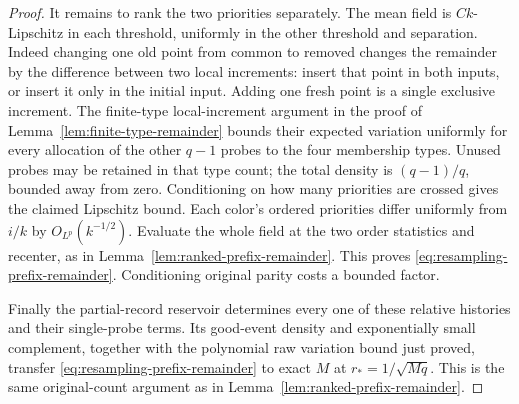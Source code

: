 \documentclass[11pt,letterpaper]{article}
\begin{document}
\begin{proof}
It remains to rank the two priorities separately.
The mean field is $Ck$-Lipschitz in each threshold, uniformly
in the other threshold and separation.
Indeed changing one old point from common to removed changes
the remainder by the difference between two local increments:
insert that point in both inputs, or insert it only in
the initial input. Adding one fresh point is a single
exclusive increment.
The finite-type local-increment argument in the proof of
Lemma~\ref{lem:finite-type-remainder} bounds their expected
variation uniformly for every allocation of the other
$q-1$ probes to the four membership types.
Unused probes may be retained in that type count; the
total density is $(q-1)/q$, bounded away from zero.
Conditioning on how many priorities are crossed gives the
claimed Lipschitz bound.
Each color's ordered priorities differ uniformly from
$i/k$ by $O_{L^p}(k^{-1/2})$.
Evaluate the whole field at the two order statistics and
recenter, as in Lemma~\ref{lem:ranked-prefix-remainder}.
This proves \eqref{eq:resampling-prefix-remainder}.
Conditioning original parity costs a bounded factor.

Finally the partial-record reservoir determines every one
of these relative histories and their single-probe terms.
Its good-event density and exponentially small complement,
together with the polynomial raw variation bound just proved,
transfer \eqref{eq:resampling-prefix-remainder} to exact $M$
at $r_*=1/\sqrt{Mq}$. This is the same original-count
argument as in Lemma~\ref{lem:ranked-prefix-remainder}.
\end{proof}
\end{document}
